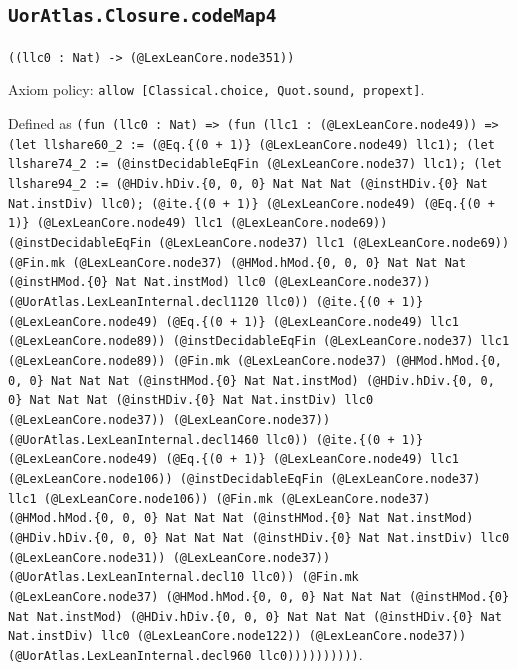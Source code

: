 \documentclass[11pt]{article}
\begin{document}
\subsection*{\texttt{UorAtlas.Closure.codeMap4}}
\noindent\texttt{((llc0 : Nat) -> (@LexLeanCore.node351))}\par
\noindent Axiom policy: \texttt{allow [Classical.choice, Quot.sound, propext]}.\par
\noindent Defined as \texttt{(fun (llc0 : Nat) => (fun (llc1 : (@LexLeanCore.node49)) => (let llshare60\_2 := (@Eq.\{(0 + 1)\} (@LexLeanCore.node49) llc1); (let llshare74\_2 := (@instDecidableEqFin (@LexLeanCore.node37) llc1); (let llshare94\_2 := (@HDiv.hDiv.\{0, 0, 0\} Nat Nat Nat (@instHDiv.\{0\} Nat Nat.instDiv) llc0); (@ite.\{(0 + 1)\} (@LexLeanCore.node49) (@Eq.\{(0 + 1)\} (@LexLeanCore.node49) llc1 (@LexLeanCore.node69)) (@instDecidableEqFin (@LexLeanCore.node37) llc1 (@LexLeanCore.node69)) (@Fin.mk (@LexLeanCore.node37) (@HMod.hMod.\{0, 0, 0\} Nat Nat Nat (@instHMod.\{0\} Nat Nat.instMod) llc0 (@LexLeanCore.node37)) (@UorAtlas.LexLeanInternal.decl1120 llc0)) (@ite.\{(0 + 1)\} (@LexLeanCore.node49) (@Eq.\{(0 + 1)\} (@LexLeanCore.node49) llc1 (@LexLeanCore.node89)) (@instDecidableEqFin (@LexLeanCore.node37) llc1 (@LexLeanCore.node89)) (@Fin.mk (@LexLeanCore.node37) (@HMod.hMod.\{0, 0, 0\} Nat Nat Nat (@instHMod.\{0\} Nat Nat.instMod) (@HDiv.hDiv.\{0, 0, 0\} Nat Nat Nat (@instHDiv.\{0\} Nat Nat.instDiv) llc0 (@LexLeanCore.node37)) (@LexLeanCore.node37)) (@UorAtlas.LexLeanInternal.decl1460 llc0)) (@ite.\{(0 + 1)\} (@LexLeanCore.node49) (@Eq.\{(0 + 1)\} (@LexLeanCore.node49) llc1 (@LexLeanCore.node106)) (@instDecidableEqFin (@LexLeanCore.node37) llc1 (@LexLeanCore.node106)) (@Fin.mk (@LexLeanCore.node37) (@HMod.hMod.\{0, 0, 0\} Nat Nat Nat (@instHMod.\{0\} Nat Nat.instMod) (@HDiv.hDiv.\{0, 0, 0\} Nat Nat Nat (@instHDiv.\{0\} Nat Nat.instDiv) llc0 (@LexLeanCore.node31)) (@LexLeanCore.node37)) (@UorAtlas.LexLeanInternal.decl10 llc0)) (@Fin.mk (@LexLeanCore.node37) (@HMod.hMod.\{0, 0, 0\} Nat Nat Nat (@instHMod.\{0\} Nat Nat.instMod) (@HDiv.hDiv.\{0, 0, 0\} Nat Nat Nat (@instHDiv.\{0\} Nat Nat.instDiv) llc0 (@LexLeanCore.node122)) (@LexLeanCore.node37)) (@UorAtlas.LexLeanInternal.decl960 llc0))))))))))}.\par
\end{document}
